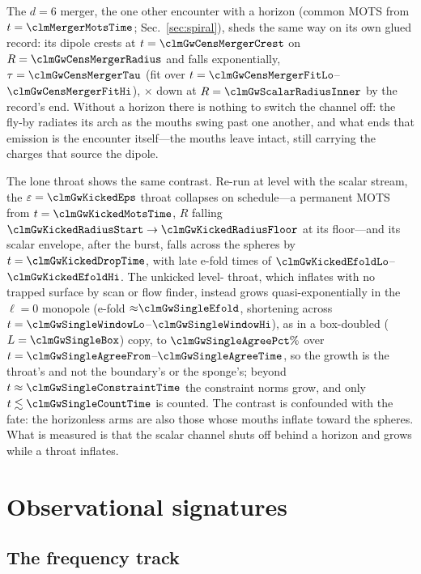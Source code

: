 \documentclass[twocolumn,floatfix,aps,prd,superscriptaddress,nofootinbib]{revtex4-2}
\begin{document}
The $d=6$ merger, the one other encounter with a horizon (common MOTS from $t=\clmMergerMotsTime$; Sec.~\ref{sec:spiral}), sheds the same way on its own glued record: its dipole crests at $t=\clmGwCensMergerCrest$ on $R=\clmGwCensMergerRadius$ and falls exponentially, $\tau=\clmGwCensMergerTau$ (fit over $t=\clmGwCensMergerFitLo$--$\clmGwCensMergerFitHi$), \clmGwCensMergerDrop$\times$ down at $R=\clmGwScalarRadiusInner$ by the record's end. Without a horizon there is nothing to switch the channel off: the fly-by radiates its arch as the mouths swing past one another, and what ends that emission is the encounter itself---the mouths leave intact, still carrying the charges that source the dipole.

The lone throat shows the same contrast. Re-run at level \clmGwKickedLevel{} with the scalar stream, the $\varepsilon=\clmGwKickedEps$ throat collapses on schedule---a permanent MOTS from $t=\clmGwKickedMotsTime$, $R$ falling $\clmGwKickedRadiusStart\to\clmGwKickedRadiusFloor$ at its floor---and its scalar envelope, after the burst, falls across the spheres by $t=\clmGwKickedDropTime$, with late e-fold times of $\clmGwKickedEfoldLo$--$\clmGwKickedEfoldHi$. The unkicked level-\clmGwSingleLevel{} throat, which inflates with no trapped surface by scan or flow finder, instead grows quasi-exponentially in the $\ell=0$ monopole (e-fold ${\approx}\clmGwSingleEfold$, shortening across $t=\clmGwSingleWindowLo$--$\clmGwSingleWindowHi$), as in a box-doubled ($L=\clmGwSingleBox$) copy, to $\clmGwSingleAgreePct\%$ over $t=\clmGwSingleAgreeFrom$--$\clmGwSingleAgreeTime$, so the growth is the throat's and not the boundary's or the sponge's; beyond $t\approx\clmGwSingleConstraintTime$ the constraint norms grow, and only $t\lesssim\clmGwSingleCountTime$ is counted. The contrast is confounded with the fate: the horizonless arms are also those whose mouths inflate toward the spheres. What is measured is that the scalar channel shuts off behind a horizon and grows while a throat inflates.

\section{Observational signatures}
\label{sec:ligo}

\subsection{The frequency track}
\label{sec:ligo:ringdown}
\end{document}
